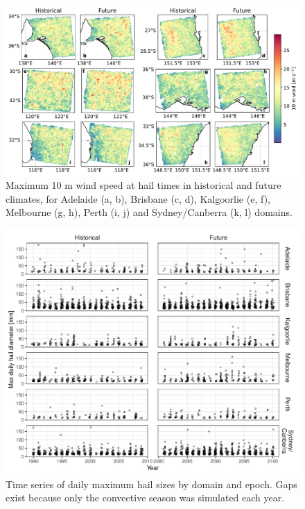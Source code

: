 \documentclass[draft,grl]{agutexSI2019}\usepackage[]{graphicx}\usepackage[]{xcolor}
\begin{document}
\begin{figure}[!ht]
    \includegraphics[width=\textwidth]{figures/max_10m_winds_by_domain}
    \caption{Maximum 10 m wind speed at hail times in historical and future climates, for Adelaide (a, b), Brisbane (c, d), Kalgoorlie (e, f), Melbourne (g, h), Perth (i, j) and Sydney/Canberra (k, l) domains.}
    \label{fig:max_wind_by_domain}
\end{figure}

\begin{figure}[!ht]
    \includegraphics[width=\textwidth]{figures/timeseries_hail}
    \caption{Time series of daily maximum hail sizes by domain and epoch. Gaps exist because only the convective season was simulated each year.}
    \label{fig:timeseries_hail}
\end{figure}
\end{document}
